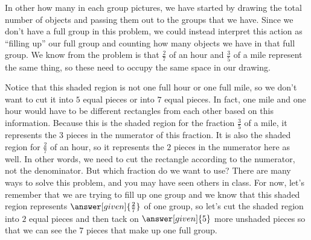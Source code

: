 \documentclass{ximera}
\begin{document}
\begin{example}
In other how many in each group pictures, we have started by drawing the total number of objects and passing them out to the groups that we have. Since we don't have a full group in this problem, we could instead interpret this action as  ``filling up'' our full group and counting how many objects we have in that full group. We know from the problem is that $\frac{2}{7}$ of an hour and $\frac{3}{5}$ of a mile represent the same thing, so these need to occupy the same space in our drawing. 
\begin{image}
\end{image}
Notice that this shaded region is not one full hour or one full mile, so we don't want to cut it into $5$ equal pieces or into $7$ equal pieces. In fact, one mile and one hour would have to be different rectangles from each other based on this information. Because this is the shaded region for the fraction $\frac{3}{5}$ of a mile, it represents the $3$ pieces in the numerator of this fraction. It is also the shaded region for $\frac{2}{7}$ of an hour, so it represents the $2$ pieces in the numerator here as well. In other words, we need to cut the rectangle according to the numerator, not the denominator. But which fraction do we want to use? There are many ways to solve this problem, and you may have seen others in class. For now, let's remember that we are trying to fill up one group and we know that this shaded region represents $\answer[given]{\frac{2}{7}}$ of one group, so let's cut the shaded region into $2$ equal pieces and then tack on $\answer[given]{5}$ more unshaded pieces so that we can see the $7$ pieces that make up one full group.
\begin{image}
\end{image}


\end{example}
\end{document}
